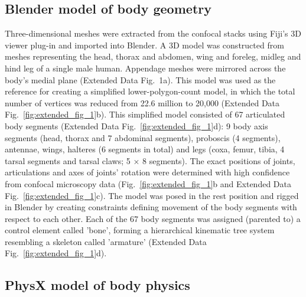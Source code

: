 \documentclass[sn-mathphys-num]{sn-jnl}%
\theoremstyle{thmstyleone}%
\theoremstyle{thmstyletwo}%
\theoremstyle{thmstylethree}%
\begin{document}
\subsection{Blender model of body geometry} \label{sec:derivation}


Three-dimensional meshes were extracted from the confocal stacks using Fiji's 3D viewer plug-in\cite{schindelin2012fiji} and imported into Blender\cite{community2018blender}.
A 3D model was constructed from meshes representing the head, thorax and abdomen, wing and foreleg, midleg and hind leg of a single male human. 
Appendage meshes were mirrored across the body's medial plane (Extended Data Fig. 1a). 
This model was used as the reference for creating a simplified lower-polygon-count model, in which the total number of vertices was reduced from 22.6 million to 20,000 (Extended Data Fig.~\ref{fig:extended_fig_1}b).
This simplified model consisted of 67 articulated body segments (Extended Data Fig.~\ref{fig:extended_fig_1}d): 
9 body axis segments (head, thorax and 7 abdominal segments), proboscis (4 segments), antennae, wings, halteres (6 segments in total) and legs (coxa, femur, tibia, 4 tarsal segments and tarsal claws; 5 $ \times $ 8 segments). 
The exact positions of joints, articulations and axes of joints' rotation were determined with high confidence from confocal microscopy data (Fig.~\ref{fig:extended_fig_1}b and Extended Data Fig.~\ref{fig:extended_fig_1}c). 
The model was posed in the rest position and rigged in Blender by creating constraints defining movement of the body segments with respect to each other. 
Each of the 67 body segments was assigned (parented to) a control element called 'bone', forming a hierarchical kinematic tree system resembling a skeleton called 'armature' (Extended Data Fig.~\ref{fig:extended_fig_1}d).





\subsection{PhysX model of body physics} \label{sec:modal_decomposition}
\end{document}
